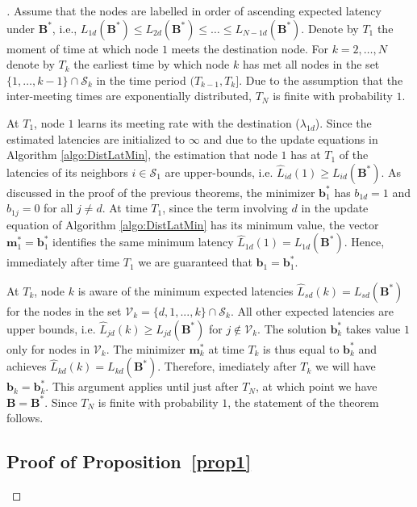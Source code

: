 \documentclass[journal,onecolumn,11pt]{IEEEtran}
\theoremstyle{plain}
\theoremstyle{definition}
\begin{document}
\begin{proof}[\unskip\nopunct]
  Assume that the nodes are labelled in order of ascending expected
  latency under $\mathbf{B}^*$, i.e., $L_{1d}(\mathbf{B}^*) \leq
  L_{2d}(\mathbf{B}^*) \leq \dots \leq L_{N-1 d}(\mathbf{B}^*)$. Denote
  by $T_{1}$ the moment of time at which node $1$ meets the
  destination node. For $k=2,\dots,N$ denote by $T_{k}$ the earliest
  time by which node $k$ has met all nodes in the set
  $\{1,\dots,k-1\}\cap \mathcal{S}_k$ in the time period
  $(T_{k-1},T_{k}]$. Due to the assumption that the inter-meeting
  times are exponentially distributed, $T_{N}$ is finite with
  probability $1$.

  At $T_{1}$, node $1$ learns its meeting rate with the
  destination ($\lambda_{1d}$). Since the estimated latencies are initialized
  to $\infty$ and due to the update equations in Algorithm
  \ref{algo:DistLatMin}, the estimation that node $1$ has at
  $T_{1}$ of the latencies of its neighbors $i \in
  \mathcal{S}_{1}$ are upper-bounds, i.e. $\widehat{L}_{id}(1) \geq
  L_{id}(\mathbf{B}^*)$. As discussed in the proof of the previous
  theorems, the minimizer $\mathbf{b}^*_{1}$ has $b_{1d}=1$ and
  $b_{1j}=0$ for all $j\neq d$. At time $T_{1}$,
  since the term involving $d$ in the update equation of Algorithm
  \ref{algo:DistLatMin} has its minimum value, the vector
  $\mathbf{m}_{1}^*=\mathbf{b}_{1}^*$ identifies the same minimum
  latency $\widehat{L}_{1d}(1) = L_{1d}(\mathbf{B}^*)$. Hence,
  immediately after time $T_{1}$ we are guaranteed that
  $\mathbf{b}_{1}=\mathbf{b}_{1}^*$.

  At $T_{k}$, node $k$ is aware of the minimum expected latencies
  $\widehat{L}_{sd}(k)=L_{sd}(\mathbf{B^*})$ for the nodes in the set
  $\mathcal{V}_k = \{d,1,...,k\}\cap \mathcal{S}_{k}$. All other expected latencies
  are upper bounds, i.e. $\widehat{L}_{jd}(k) \geq L_{jd}(\mathbf{B}^*)$ for
  $j\notin \mathcal{V}_k$. The solution
  $\mathbf{b}^*_{k}$ takes value $1$ only for nodes in
  $\mathcal{V}_k$. The minimizer $\mathbf{m}^*_{k}$ at time $T_k$ is thus equal to
  $\mathbf{b}^*_{k}$ and achieves $\widehat{L}_{kd}(k)=L_{kd}(\mathbf{B}^*)$. Therefore, imediately
  after $T_{k}$ we will have $\mathbf{b}_{k}=\mathbf{b}_{k}^*$. This argument applies until just after $T_{N}$, at which point we
  have $\mathbf{B} = \mathbf{B} ^*$. Since $T_{N}$ is finite with
  probability $1$, the statement of the theorem follows.
  
\subsection{Proof of Proposition~\ref{prop1}}


\end{proof}
\end{document}
